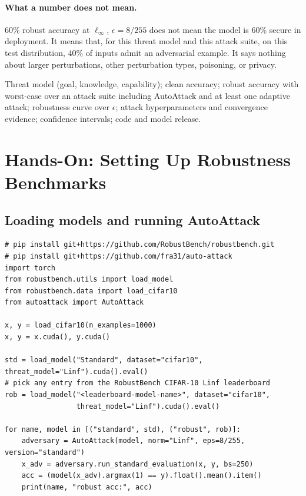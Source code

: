 \documentclass[10pt,a4paper]{extarticle}
\theoremstyle{definition}
\begin{document}
\paragraph{What a number does not mean.} 60\% robust accuracy at \(\ell_\infty\), \(\epsilon=8/255\) does not mean the model is 60\% secure in deployment. It means that, for this threat model and this attack suite, on this test distribution, 40\% of inputs admit an adversarial example. It says nothing about larger perturbations, other perturbation types, poisoning, or privacy.

\begin{keybox}
Threat model (goal, knowledge, capability); clean accuracy; robust accuracy with worst-case over an attack suite including AutoAttack and at least one adaptive attack; robustness curve over \(\epsilon\); attack hyperparameters and convergence evidence; confidence intervals; code and model release.
\end{keybox}

\section{Hands-On: Setting Up Robustness Benchmarks}

\subsection{Loading models and running AutoAttack}

\begin{lstlisting}
# pip install git+https://github.com/RobustBench/robustbench.git
# pip install git+https://github.com/fra31/auto-attack
import torch
from robustbench.utils import load_model
from robustbench.data import load_cifar10
from autoattack import AutoAttack

x, y = load_cifar10(n_examples=1000)
x, y = x.cuda(), y.cuda()

std = load_model("Standard", dataset="cifar10", threat_model="Linf").cuda().eval()
# pick any entry from the RobustBench CIFAR-10 Linf leaderboard
rob = load_model("<leaderboard-model-name>", dataset="cifar10",
                 threat_model="Linf").cuda().eval()

for name, model in [("standard", std), ("robust", rob)]:
    adversary = AutoAttack(model, norm="Linf", eps=8/255, version="standard")
    x_adv = adversary.run_standard_evaluation(x, y, bs=250)
    acc = (model(x_adv).argmax(1) == y).float().mean().item()
    print(name, "robust acc:", acc)
\end{lstlisting}
\end{document}
